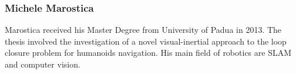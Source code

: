 \documentclass[conference]{IEEEtran}
\begin{document}
\subsubsection*{Michele Marostica}
Marostica received his Master Degree from University of Padua in 2013. The thesis involved the investigation of a novel visual-inertial approach to the loop closure problem for humanoids navigation. His main field of robotics are SLAM and computer vision.
\end{document}
